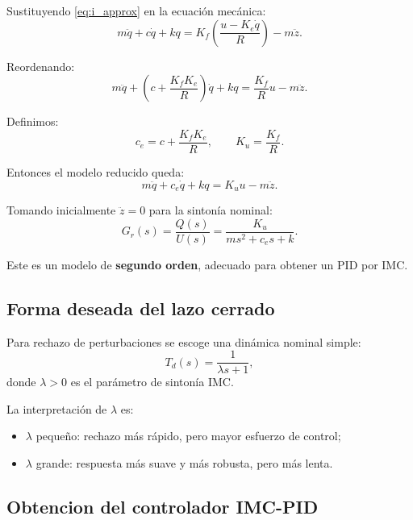 \documentclass[11pt]{article}
\begin{document}
Sustituyendo \eqref{eq:i_approx} en la ecuaci\'on mec\'anica:
\begin{equation}
m\ddot q + c\dot q + kq
=
K_f\left(\frac{u-K_e\dot q}{R}\right)-m\ddot z.
\end{equation}

Reordenando:
\begin{equation}
m\ddot q + \left(c+\frac{K_fK_e}{R}\right)\dot q + kq
=
\frac{K_f}{R}u - m\ddot z.
\label{eq:reduced_mech}
\end{equation}

Definimos:
\begin{equation}
c_e = c+\frac{K_fK_e}{R},
\qquad
K_u = \frac{K_f}{R}.
\label{eq:reduced_params}
\end{equation}

Entonces el modelo reducido queda:
\begin{equation}
m\ddot q + c_e\dot q + kq = K_u u - m\ddot z.
\label{eq:reduced_model}
\end{equation}

Tomando inicialmente $\ddot z=0$ para la sinton\'ia nominal:
\begin{equation}
G_r(s)=\frac{Q(s)}{U(s)}
=
\frac{K_u}{ms^2+c_e s+k}.
\label{eq:Greduced}
\end{equation}

Este es un modelo de \textbf{segundo orden}, adecuado para obtener un PID por IMC.

\subsection{Forma deseada del lazo cerrado}

Para rechazo de perturbaciones se escoge una din\'amica nominal simple:
\begin{equation}
T_d(s)=\frac{1}{\lambda s+1},
\label{eq:Td}
\end{equation}
donde $\lambda>0$ es el par\'ametro de sinton\'ia IMC.

La interpretaci\'on de $\lambda$ es:

\begin{itemize}[leftmargin=1.2cm]
\item $\lambda$ peque\~no: rechazo m\'as r\'apido, pero mayor esfuerzo de control;
\item $\lambda$ grande: respuesta m\'as suave y m\'as robusta, pero m\'as lenta.
\end{itemize}

\subsection{Obtencion del controlador IMC-PID}
\end{document}
